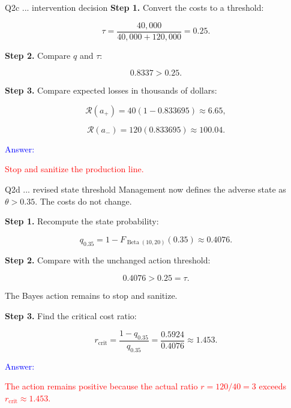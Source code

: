 \documentclass[aspectratio=43,10pt]{beamer}
\newcommand{\Risk}{\mathcal{R}}
\newcommand{\answer}[1]{\textcolor{red}{#1}}
\begin{document}

\begin{frame}{}
\begin{block}{Q2c ... intervention decision}
  \textbf{Step 1.} Convert the costs to a threshold:

  \[
  \tau=\frac{40{,}000}{40{,}000+120{,}000}=0.25.
  \]
  
  \pause

  \textbf{Step 2.} Compare $q$ and $\tau$:

  \[
  0.8337>0.25.
  \]
  
  \pause

  \textbf{Step 3.} Compare expected losses in thousands of dollars:

  \[
  \Risk(a_+)=40(1-0.833695)\approx6.65,
  \]

  \[
  \Risk(a_-)=120(0.833695)\approx100.04.
  \]

  \textcolor{blue}{Answer:}

  \answer{Stop and sanitize the production line.}
\end{block}
\end{frame}


\begin{frame}{}
\begin{block}{Q2d ... revised state threshold}
  Management now defines the adverse state as $\theta>0.35$. The costs
  do not change.

  \textbf{Step 1.} Recompute the state probability:

  \[
  q_{0.35}=1-F_{\operatorname{Beta}(10,20)}(0.35)
  \approx0.4076.
  \]
  
  \pause

  \textbf{Step 2.} Compare with the unchanged action threshold:

  \[
  0.4076>0.25=\tau.
  \]

  The Bayes action remains to stop and sanitize.
  
  \pause

  \textbf{Step 3.} Find the critical cost ratio:

  \[
  r_{\mathrm{crit}}=\frac{1-q_{0.35}}{q_{0.35}}
  =\frac{0.5924}{0.4076}\approx1.453.
  \]

  \textcolor{blue}{Answer:}

  \answer{
    The action remains positive because the actual ratio $r=120/40=3$
    exceeds $r_{\mathrm{crit}}\approx1.453$.
  }
\end{block}
\end{frame}

\end{document}
